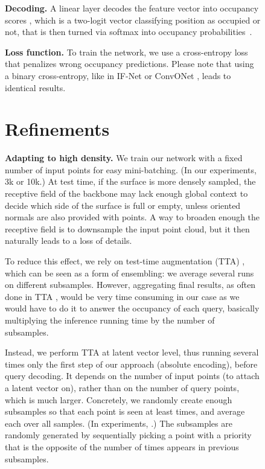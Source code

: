 \documentclass[10pt,twocolumn,letterpaper]{article}
\begin{document}
\begin{figure}[t]
\textbf{Decoding.} A linear layer  decodes the feature vector 
 into occupancy scores , which is a two-logit vector classifying position  as occupied or not, that is then turned via softmax into occupancy probabilities~.

\textbf{Loss function.} To train the network, we use a cross-entropy loss that penalizes wrong occupancy predictions. Please note that using a binary cross-entropy, like in IF-Net \cite{Chibane2020CVPR} or ConvONet \cite{Peng2020ECCV}, leads to identical 
results.




















\section{Refinements}

\textbf{Adapting to high density.}
We train our network with a fixed number  of input points for easy mini-batching. (In our experiments, 3k  or  10k.) 
At test time, if the surface is more densely sampled, the receptive field of the backbone may lack enough global context to decide which side of the surface is full or empty, unless oriented normals are also provided with points. 
A way to broaden enough the receptive field is to downsample the input point cloud, but it then naturally leads to a loss of details.

To reduce this effect, we rely on test-time augmentation (TTA) \cite{krizhevsky2012imagenet}, which can be seen as a form of ensembling: we average several runs on different subsamples.
However, aggregating final results, as often done in TTA \cite{Shanmugam2021BetterAggregation}, would be very time consuming in our case as we would have to do it to answer the occupancy of each query, basically multiplying the inference running time by the number of subsamples.

Instead, we perform TTA at latent vector level, thus running several times only the first step of our approach (absolute encoding), before query decoding. It depends on the number of input points (to attach a latent vector on), rather than on the number of query points, which is much larger.
Concretely, we randomly create enough subsamples so that each point  is seen at least  times, and average each  over all samples. (In experiments, .) The subsamples are randomly generated by sequentially picking a point  with a priority that is the opposite of the number of times  appears in previous subsamples.


\end{figure}
\end{document}
